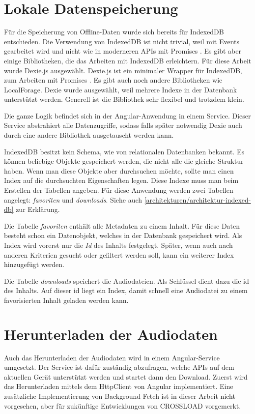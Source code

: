 \section{Lokale Datenspeicherung}
\label{Kap5:Speicherung}
Für die Speicherung von Offline-Daten wurde sich bereits für IndexedDB entschieden. Die Verwendung von IndexedDB ist nicht trivial, weil mit Events gearbeitet wird und nicht wie in moderneren APIs mit Promises \autocite{mdn-indexeddb}. Es gibt aber einige Bibliotheken, die das Arbeiten mit IndexedDB erleichtern. Für diese Arbeit wurde Dexie.js ausgewählt. Dexie.js ist ein minimaler Wrapper für IndexedDB, zum Arbeiten mit Promises \autocite{dexie}. Es gibt auch noch andere Bibliotheken wie LocalForage. Dexie wurde ausgewählt, weil mehrere Indexe in der Datenbank unterstützt werden. Generell ist die Bibliothek sehr flexibel und trotzdem klein.

Die ganze Logik befindet sich in der Angular-Anwendung in einem Service. Dieser Service abstrahiert alle Datenzugriffe, sodass falls später notwendig Dexie auch durch eine andere Bibliothek ausgetauscht werden kann. 

IndexedDB besitzt kein Schema, wie von relationalen Datenbanken bekannt. Es können beliebige Objekte gespeichert werden, die nicht alle die gleiche Struktur haben. Wenn man diese Objekte aber durchsuchen möchte, sollte man einen Index auf die durchsuchten Eigenschaften legen. Diese Indexe muss man beim Erstellen der Tabellen angeben. Für diese Anwendung werden zwei Tabellen angelegt: \emph{favoriten} und \emph{downloads}. Siehe auch \autoref{architekturen/architektur-indexed-db} zur Erklärung.

Die Tabelle \emph{favoriten} enthält alle Metadaten zu einem Inhalt. Für diese Daten besteht schon ein Datenobjekt, welches in der Datenbank gespeichert wird. Als Index wird vorerst nur die \emph{Id} des Inhalts festgelegt. Später, wenn auch nach anderen Kriterien gesucht oder gefiltert werden soll, kann ein weiterer Index hinzugefügt werden. 

Die Tabelle \emph{downloads} speichert die Audiodateien. Als Schlüssel dient dazu die id des Inhalts. Auf dieser id liegt ein Index, damit schnell eine Audiodatei zu einem favorisierten Inhalt geladen werden kann.

\section{Herunterladen der Audiodaten}
Auch das Herunterladen der Audiodaten wird in einem Angular-Service umgesetzt. Der Service ist dafür zuständig abzufragen, welche APIs auf dem aktuellen Gerät unterstützt werden und startet dann den Download. Zuerst wird das Herunterladen mittels dem HttpClient von Angular implementiert. Eine zusätzliche Implementierung von Background Fetch ist in dieser Arbeit nicht vorgesehen, aber für zukünftige Entwicklungen von CROSSLOAD vorgemerkt. 

